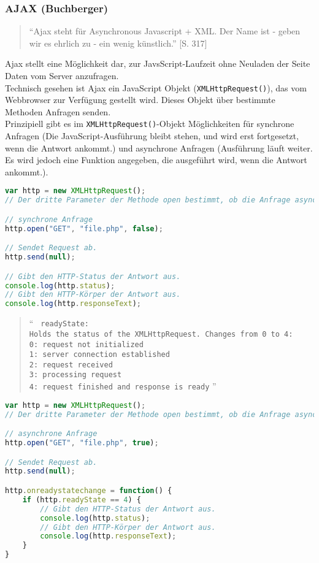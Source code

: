\subsubsection{AJAX (Buchberger)} 
\label{sec:content_js_AJAX}
\begin{quote}
\enquote{Ajax steht für Asynchronous Javascript + XML. Der Name ist - geben wir es ehrlich zu - ein wenig künstlich.} \cite{ajax}[S. 317]
\end{quote}
Ajax stellt eine Möglichkeit dar, zur JavsScript-Laufzeit ohne Neuladen der Seite Daten vom Server anzufragen.\\
Technisch gesehen ist Ajax ein JavaScript Objekt (\texttt{XMLHttpRequest()}), das vom Webbrowser zur Verfügung gestellt wird. Dieses Objekt über bestimmte Methoden Anfragen senden.\\
Prinzipiell gibt es im \texttt{XMLHttpRequest()}-Objekt Möglichkeiten für synchrone Anfragen (Die JavaScript-Ausführung bleibt stehen, und wird erst fortgesetzt, wenn die Antwort ankommt.) und asynchrone Anfragen (Ausführung läuft weiter. Es wird jedoch eine Funktion angegeben, die ausgeführt wird, wenn die Antwort ankommt.).\\
\begin{lstlisting}[style=custom, language=JavaScript,  caption={Synchrones AJAX},label={lst:content_ajax_0}]
var http = new XMLHttpRequest();
// Der dritte Parameter der Methode open bestimmt, ob die Anfrage asynchron sein soll.

// synchrone Anfrage
http.open("GET", "file.php", false);

// Sendet Request ab.
http.send(null);

// Gibt den HTTP-Status der Antwort aus.
console.log(http.status);
// Gibt den HTTP-Körper der Antwort aus.
console.log(http.responseText);
\end{lstlisting}
\begin{quote}
\enquote{
\texttt{
readyState:\\
Holds the status of the XMLHttpRequest. Changes from 0 to 4:\\
0: request not initialized\\
1: server connection established\\
2: request received\\
3: processing request\\ 
4: request finished and response is ready} \cite{readyState}
}
\end{quote}
\begin{lstlisting}[style=custom, language=JavaScript,  caption={Asynchrones AJAX},label={lst:content_ajax_1}]
var http = new XMLHttpRequest();
// Der dritte Parameter der Methode open bestimmt, ob die Anfrage asynchron sein soll.

// asynchrone Anfrage
http.open("GET", "file.php", true);

// Sendet Request ab.
http.send(null);

http.onreadystatechange = function() {
	if (http.readyState == 4) {
		// Gibt den HTTP-Status der Antwort aus.
		console.log(http.status);
		// Gibt den HTTP-Körper der Antwort aus.
		console.log(http.responseText);
	}
}
\end{lstlisting}

